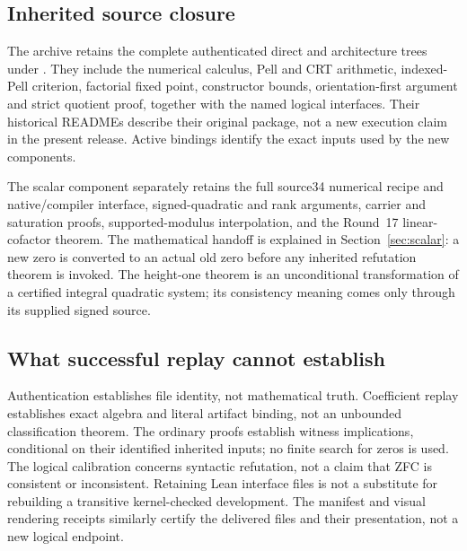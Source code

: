 \subsection{Inherited source closure}
The archive retains the complete authenticated direct and architecture
trees under . They include the numerical
calculus, Pell and CRT arithmetic, indexed-Pell criterion, factorial
fixed point, constructor bounds, orientation-first argument and strict
quotient proof, together with the named logical interfaces. Their
historical READMEs describe their original package, not a new execution
claim in the present release. Active bindings identify the exact inputs
used by the new components.

The scalar component separately retains the full source34 numerical
recipe and native/compiler interface, signed-quadratic and rank
arguments, carrier and saturation proofs, supported-modulus interpolation,
and the Round~17 linear-cofactor theorem. The mathematical handoff is
explained in Section~\ref{sec:scalar}: a new zero is converted to an actual
old zero before any inherited refutation theorem is invoked.
The height-one theorem is an unconditional transformation of a certified
integral quadratic system; its consistency meaning comes only through
its supplied signed source.

\subsection{What successful replay cannot establish}
Authentication establishes file identity, not mathematical truth.
Coefficient replay establishes exact algebra and literal artifact binding,
not an unbounded classification theorem. The ordinary proofs establish
witness implications, conditional on their identified inherited inputs;
no finite search for zeros is used. The logical calibration concerns
syntactic refutation, not a claim that ZFC is consistent or inconsistent.
Retaining Lean interface files is not a substitute for rebuilding a
transitive kernel-checked development. The manifest and visual rendering
receipts similarly certify the delivered files and their presentation,
not a new logical endpoint.
